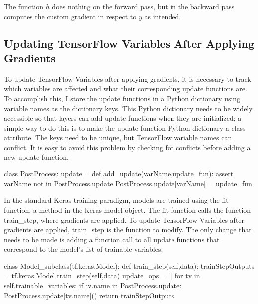 The function $h$ does nothing on the forward pass, but in the backward pass computes the custom gradient in respect to $y$ as intended.

\subsection{Updating TensorFlow Variables After Applying Gradients}
To update TensorFlow Variables after applying gradients, it is necessary to track which variables are affected and what their corresponding update functions are. To accomplish this, I store the update functions in a Python dictionary using variable names as the dictionary keys. This Python dictionary needs to be widely accessible so that layers can add update functions when they are initialized; a simple way to do this is to make the update function Python dictionary a class attribute. The keys need to be unique, but TensorFlow variable names can conflict. It is easy to avoid this problem by checking for conflicts before adding a new update function.

\begin{code}
class PostProcess:
    update = {}
    def add_update(varName,update_fun):
        assert varName not in PostProcess.update
        PostProcess.update[varName] = update_fun
\end{code}


In the standard Keras training paradigm, models are trained using the fit function, a method in the Keras model object. The fit function calls the function train\_step, where gradients are applied.  To update TensorFlow Variables after gradients are applied, train\_step is the function to modify. The only change that needs to be made is adding a function call to all update functions that correspond to the model's list of trainable variables.

\begin{code}
class Model_subclass(tf.keras.Model):
    def train_step(self,data):
        trainStepOutputs = tf.keras.Model.train_step(self,data)
        update_ops = []
        for tv in self.trainable_variables:
            if tv.name in PostProcess.update:
                PostProcess.update[tv.name]()
        return trainStepOutputs
\end{code}

